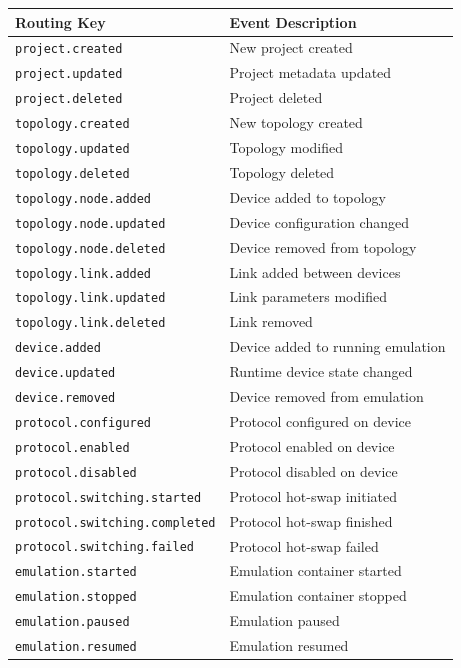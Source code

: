 \documentclass[10pt,a4paper]{article}
\begin{document}
\begin{table}[htbp]
\centering
\small
\begin{tabularx}{\textwidth}{lX}
\toprule
\textbf{Routing Key} & \textbf{Event Description} \\
\midrule
\texttt{project.created} & New project created \\
\texttt{project.updated} & Project metadata updated \\
\texttt{project.deleted} & Project deleted \\
\texttt{topology.created} & New topology created \\
\texttt{topology.updated} & Topology modified \\
\texttt{topology.deleted} & Topology deleted \\
\texttt{topology.node.added} & Device added to topology \\
\texttt{topology.node.updated} & Device configuration changed \\
\texttt{topology.node.deleted} & Device removed from topology \\
\texttt{topology.link.added} & Link added between devices \\
\texttt{topology.link.updated} & Link parameters modified \\
\texttt{topology.link.deleted} & Link removed \\
\texttt{device.added} & Device added to running emulation \\
\texttt{device.updated} & Runtime device state changed \\
\texttt{device.removed} & Device removed from emulation \\
\texttt{protocol.configured} & Protocol configured on device \\
\texttt{protocol.enabled} & Protocol enabled on device \\
\texttt{protocol.disabled} & Protocol disabled on device \\
\texttt{protocol.switching.started} & Protocol hot-swap initiated \\
\texttt{protocol.switching.completed} & Protocol hot-swap finished \\
\texttt{protocol.switching.failed} & Protocol hot-swap failed \\
\texttt{emulation.started} & Emulation container started \\
\texttt{emulation.stopped} & Emulation container stopped \\
\texttt{emulation.paused} & Emulation paused \\
\texttt{emulation.resumed} & Emulation resumed \\
\bottomrule
\end{tabularx}
\end{table}
\end{document}
